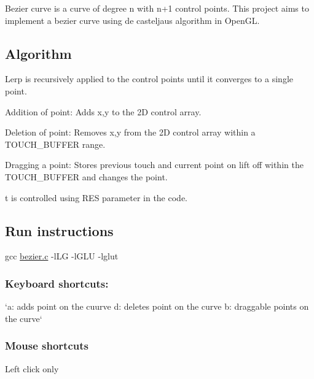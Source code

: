 Bezier curve is a curve of degree n with n+1 control points. This project aims to implement a bezier curve using de casteljau\textquotesingle{}s algorithm in Open\+GL.

\subsection*{Algorithm}

Lerp is recursively applied to the control points until it converges to a single point.

Addition of point\+: Add\textquotesingle{}s x,y to the 2D control array.

Deletion of point\+: Removes x,y from the 2D control array within a T\+O\+U\+C\+H\+\_\+\+B\+U\+F\+F\+ER range.

Dragging a point\+: Stores previous touch and current point on lift off within the T\+O\+U\+C\+H\+\_\+\+B\+U\+F\+F\+ER and changes the point.

t is controlled using R\+ES parameter in the code.

\subsection*{Run instructions}

{\ttfamily gcc \hyperlink{bezier_8c}{bezier.\+c} -\/l\+LG -\/l\+G\+LU -\/lglut}

\subsubsection*{Keyboard shortcuts\+:}

`a\+: adds point on the cuurve d\+: delete\textquotesingle{}s point on the curve b\+: draggable points on the curve`

\subsubsection*{Mouse shortcuts}

{\ttfamily Left click only} 